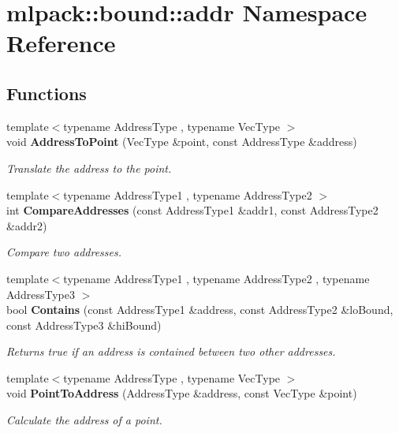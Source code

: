 \section{mlpack\+:\+:bound\+:\+:addr Namespace Reference}
\label{namespacemlpack_1_1bound_1_1addr}
\subsection*{Functions}
\begin{DoxyCompactItemize}
\item 
{\footnotesize template$<$typename Address\+Type , typename Vec\+Type $>$ }\\void \textbf{ Address\+To\+Point} (Vec\+Type \&point, const Address\+Type \&address)
\begin{DoxyCompactList}\small\item\em Translate the address to the point. \end{DoxyCompactList}\item 
{\footnotesize template$<$typename Address\+Type1 , typename Address\+Type2 $>$ }\\int \textbf{ Compare\+Addresses} (const Address\+Type1 \&addr1, const Address\+Type2 \&addr2)
\begin{DoxyCompactList}\small\item\em Compare two addresses. \end{DoxyCompactList}\item 
{\footnotesize template$<$typename Address\+Type1 , typename Address\+Type2 , typename Address\+Type3 $>$ }\\bool \textbf{ Contains} (const Address\+Type1 \&address, const Address\+Type2 \&lo\+Bound, const Address\+Type3 \&hi\+Bound)
\begin{DoxyCompactList}\small\item\em Returns true if an address is contained between two other addresses. \end{DoxyCompactList}\item 
{\footnotesize template$<$typename Address\+Type , typename Vec\+Type $>$ }\\void \textbf{ Point\+To\+Address} (Address\+Type \&address, const Vec\+Type \&point)
\begin{DoxyCompactList}\small\item\em Calculate the address of a point. \end{DoxyCompactList}\end{DoxyCompactItemize}


